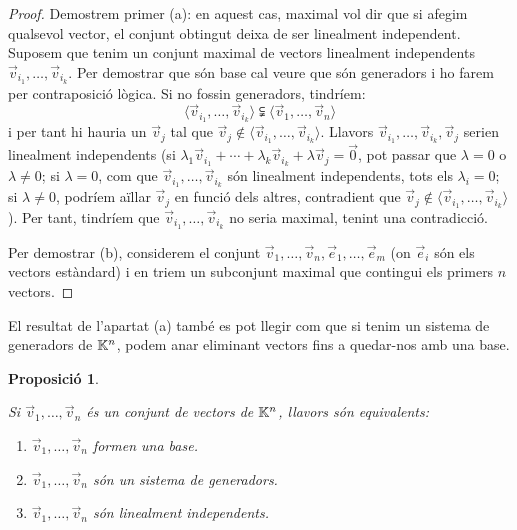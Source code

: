 \documentclass[
  11pt,
]{book}
\numberwithin{dummy}{section}
\theoremstyle{maincolornumbox}
\theoremstyle{blacknumex}
\theoremstyle{blacknumbox}
\theoremstyle{maincolornum}
\newtheorem{propositionT}{Proposició}[chapter]
\newenvironment{proposition}{\begin{pBox}\begin{propositionT}}{\end{propositionT}\end{pBox}}
\begin{document}
\begin{proof}
Demostrem primer (a): en aquest cas, maximal vol dir que si
afegim qualsevol vector, el conjunt obtingut deixa de ser linealment
independent. Suposem que tenim un conjunt maximal de vectors linealment
independents \(\vec v_{i_1}, \dots ,\vec v_{i_k}\). Per demostrar que són
base cal veure que són generadors i ho farem per contraposició lògica.
Si no fossin generadors, tindríem:
\[\langle \vec v_{i_1}, \dots ,\vec v_{i_k}\rangle \subsetneqq \langle \vec v_{1}, \dots ,\vec v_{n}\rangle\]
i per tant hi hauria un \(\vec v_j\) tal que
\(\vec v_j \not\in \langle \vec v_{i_1}, \dots ,\vec v_{i_k}\rangle\).
Llavors \(\vec v_{i_1}, \dots ,\vec v_{i_k}, \vec v_j\) serien linealment
independents (si
\(\lambda_1\vec v_{i_1}+\cdots + \lambda_k\vec v_{i_k}+\lambda \vec v_j=\vec 0\),
pot passar que \(\lambda=0\) o \(\lambda\neq0\); si \(\lambda=0\), com que
\(\vec v_{i_1}, \dots ,\vec v_{i_k}\) són linealment independents, tots
els \(\lambda_i=0\); si \(\lambda\neq 0\), podríem aïllar \(\vec v_j\) en
funció dels altres, contradient que
\(\vec v_j \not\in \langle \vec v_{i_1}, \dots ,\vec v_{i_k}\rangle\)).
Per tant, tindríem que \(\vec v_{i_1}, \dots ,\vec v_{i_k}\) no seria
maximal, tenint una contradicció.

Per demostrar (b), considerem el conjunt
\(\vec v_1,\dots,\vec v_n,\vec e_1, \dots, \vec e_m\) (on \(\vec e_i\) són
els vectors estàndard) i en triem un subconjunt maximal que contingui
els primers \(n\) vectors.
\end{proof}

El resultat de l'apartat (a) també es pot llegir com que si tenim un
sistema de generadors de \(\mathbb{K}^n\), podem anar eliminant vectors fins a
quedar-nos amb una base.

\begin{proposition}
\protect\hypertarget{prp:base-li-gen}{}\label{prp:base-li-gen}

Si
\(\vec v_1, \dots, \vec v_n\) és un conjunt de vectors de \(\mathbb{K}^n\), llavors
són equivalents:

\begin{enumerate}
\def\labelenumi{\arabic{enumi}.}
\item
  \(\vec v_1, \dots, \vec v_n\) formen una base.
\item
  \(\vec v_1, \dots, \vec v_n\) són un sistema de generadors.
\item
  \(\vec v_1, \dots, \vec v_n\) són linealment independents.
\end{enumerate}

\end{proposition}
\end{document}
